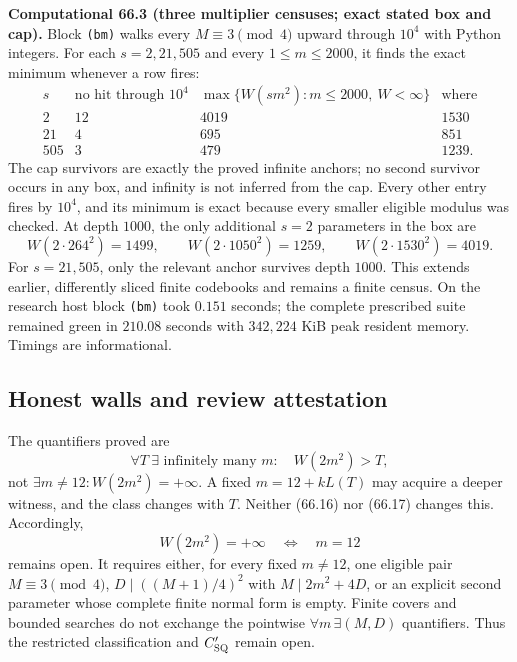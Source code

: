\documentclass[10pt,reqno]{amsart}
\theoremstyle{definition}
\newcommand{\1}{\mathbf 1}
\begin{document}
\medskip\noindent\textbf{Computational 66.3 (three multiplier censuses;
exact stated box and cap).}
Block \texttt{(bm)} walks every $M\equiv3\pmod4$ upward through $10^4$ with
Python integers.  For each $s=2,21,505$ and every $1\leq m\leq2000$, it
finds the exact minimum whenever a row fires:
\begin{equation}\tag{66.17}
\begin{array}{c|c|c|c}
 s&\text{no hit through }10^4&
 \max\{W(sm^2):m\leq2000,\ W<\infty\}&\text{where}\\ \hline
 2&12&4019&1530\\
 21&4&695&851\\
 505&3&479&1239.
\end{array}
\end{equation}
The cap survivors are exactly the proved infinite anchors; no second
survivor occurs in any box, and infinity is not inferred from the cap.
Every other entry fires by $10^4$, and its minimum is exact because every
smaller eligible modulus was checked.  At depth $1000$, the only additional
$s=2$ parameters in the box are
\begin{equation}\tag{66.18}
 W(2\cdot264^2)=1499,\qquad W(2\cdot1050^2)=1259,
 \qquad W(2\cdot1530^2)=4019.
\end{equation}
For $s=21,505$, only the relevant anchor survives depth $1000$.  This
extends earlier, differently sliced finite codebooks and remains a finite
census.  On the research host block \texttt{(bm)} took $0.151$ seconds; the
complete prescribed suite remained green in $210.08$ seconds with
$342{,}224$ KiB peak resident memory.  Timings are informational.

\subsection{Honest walls and review attestation}
The quantifiers proved are
\begin{equation}\tag{66.19}
 \forall T\ \exists\text{ infinitely many }m:\quad W(2m^2)>T,
\end{equation}
not $\exists m\ne12:W(2m^2)=+\infty$.  A fixed
$m=12+kL(T)$ may acquire a deeper witness, and the class changes with $T$.
Neither (66.16) nor (66.17) changes this.  Accordingly,
\begin{equation}\tag{66.20}
                    W(2m^2)=+\infty\quad\Longleftrightarrow\quad m=12
\end{equation}
remains open.  It requires either, for every fixed $m\ne12$, one eligible
pair $M\equiv3\pmod4$, $D\mid((M+1)/4)^2$ with
$M\mid2m^2+4D$, or an explicit second parameter whose complete finite normal
form is empty.  Finite covers and bounded searches do not exchange the
pointwise $\forall m\,\exists(M,D)$ quantifiers.  Thus the restricted
classification and $C_{\rm SQ}'$ remain open.
\end{document}
